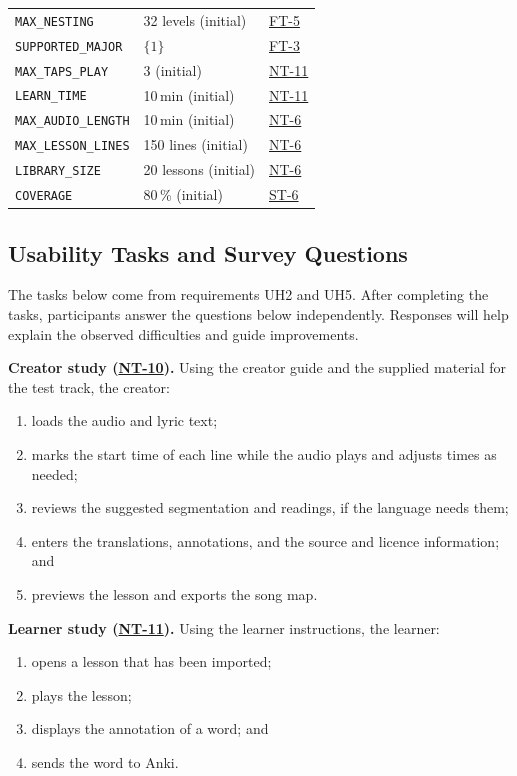 \documentclass[12pt, titlepage]{article}
\newcommand{\tref}[1]{\hyperlink{test:#1}{#1}}
\newcommand{\cn}[1]{\texttt{#1}}
\begin{document}
{\begin{longtable}{@{}P{0.28\textwidth}P{0.18\textwidth}P{0.5\textwidth}@{}}
\cn{MAX\_NESTING} & 32 levels (initial) & \tref{FT-5}\\
\cn{SUPPORTED\_MAJOR} & $\{1\}$ & \tref{FT-3}\\
\cn{MAX\_TAPS\_PLAY} & 3 (initial) & \tref{NT-11}\\
\cn{LEARN\_TIME} & 10\,min (initial) & \tref{NT-11}\\
\cn{MAX\_AUDIO\_LENGTH} & 10\,min (initial) & \tref{NT-6}\\
\cn{MAX\_LESSON\_LINES} & 150 lines (initial) & \tref{NT-6}\\
\cn{LIBRARY\_SIZE} & 20 lessons (initial) & \tref{NT-6}\\
\cn{COVERAGE} & 80\,\% (initial) & \tref{ST-6}\\
\bottomrule
\end{longtable}
}

\subsection{Usability Tasks and Survey Questions} \label{SecUsabilityTasks}

The tasks below come from requirements UH2 and UH5. After completing the
tasks, participants answer the questions below independently. Responses
will help explain the observed difficulties and guide improvements.

\textbf{Creator study (\tref{NT-10}).} Using the creator guide and the supplied
material for the test track, the creator:
\begin{enumerate}
  \item loads the audio and lyric text;
  \item marks the start time of each line while the audio plays and adjusts times
        as needed;
  \item reviews the suggested segmentation and readings, if the language needs
        them;
  \item enters the translations, annotations, and the source and licence
        information; and
  \item previews the lesson and exports the song map.
\end{enumerate}

\textbf{Learner study (\tref{NT-11}).} Using the learner instructions, the
learner:
\begin{enumerate}
  \item opens a lesson that has been imported;
  \item plays the lesson;
  \item displays the annotation of a word; and
  \item sends the word to Anki.
\end{enumerate}
\end{document}
